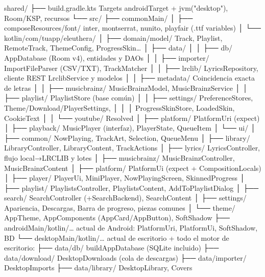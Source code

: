 \documentclass[11pt,a4paper,oneside]{report}
\begin{document}
\begin{arbol}
\begin{literal}
shared/
├── build.gradle.kts                 Targets androidTarget + jvm("desktop"), Room/KSP, recursos
└── src/
    ├── commonMain/
    │   ├── composeResources/font/   inter, montserrat, nunito, playfair (.ttf variables)
    │   └── kotlin/com/tuapp/eleuthera/
    │       ├── domain/model/        Track, Playlist, RemoteTrack, ThemeConfig, ProgressSkin…
    │       ├── data/
    │       │   ├── db/              AppDatabase (Room v4), entidades y DAOs
    │       │   ├── importer/        ImportFileParser (CSV/TXT), TrackMatcher
    │       │   ├── lrclib/          LyricsRepository, cliente REST LrclibService y modelos
    │       │   ├── metadata/        Coincidencia exacta de letras
    │       │   ├── musicbrainz/     MusicBrainzModel, MusicBrainzService
    │       │   ├── playlist/        PlaylistStore (base común)
    │       │   ├── settings/        PreferenceStores, Theme/Download/PlayerSettings,
    │       │   │                    ProgressSkinStore, LoadedSkin, CookieText
    │       │   └── youtube/         Resolved
    │       ├── platform/            PlatformUri (expect)
    │       ├── playback/            MusicPlayer (interfaz), PlayerState, QueueItem
    │       └── ui/
    │           ├── common/          NowPlaying, TrackArt, Selection, QueueMenu
    │           ├── library/         LibraryController, LibraryContent, TrackActions
    │           ├── lyrics/          LyricsController, flujo local→LRCLIB y lotes
    │           ├── musicbrainz/     MusicBrainzController, MusicBrainzContent
    │           ├── platform/        PlatformUi (expect + CompositionLocals)
    │           ├── player/          PlayerUi, MiniPlayer, NowPlayingScreen, SkinnedProgress
    │           ├── playlist/        PlaylistsController, PlaylistsContent, AddToPlaylistDialog
    │           ├── search/          SearchController (+SearchBackend), SearchContent
    │           ├── settings/        Apariencia, Descargas, Barra de progreso, piezas comunes
    │           └── theme/           AppTheme, AppComponents (AppCard/AppButton), SoftShadow
    ├── androidMain/kotlin/…         actual de Android: PlatformUri, PlatformUi, SoftShadow, BD
    └── desktopMain/kotlin/…         actual de escritorio + todo el motor de escritorio:
        ├── data/db/                 buildAppDatabase (SQLite incluido)
        ├── data/download/           DesktopDownloads (cola de descargas)
        ├── data/importer/           DesktopImports
        ├── data/library/            DesktopLibrary, Covers

\end{literal}
\end{arbol}
\end{document}
